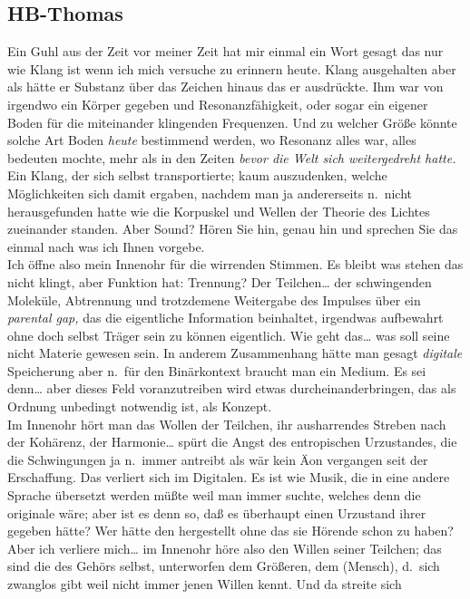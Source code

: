 \documentclass[
]{article}
\author{}
\date{\vspace{-2.5em}}
\begin{document}
\subsection{HB-Thomas}\label{hb-thomas}

Ein Guhl aus der Zeit vor meiner Zeit hat mir einmal ein Wort gesagt das
nur wie Klang ist wenn ich mich versuche zu erinnern heute. Klang
ausgehalten aber als hätte er Substanz über das Zeichen hinaus das er
ausdrückte. Ihm war von irgendwo ein Körper gegeben und
Resonanzfähigkeit, oder sogar ein eigener Boden für die miteinander
klingenden Frequenzen. Und zu welcher Größe könnte solche Art Boden
\emph{heute} bestimmend werden, wo Resonanz alles war, alles bedeuten
mochte, mehr als in den Zeiten \emph{bevor die Welt sich weitergedreht
hatte.} Ein Klang, der sich selbst transportierte; kaum auszudenken,
welche Möglichkeiten sich damit ergaben, nachdem man ja andererseits
n.~nicht herausgefunden hatte wie die Korpuskel und Wellen der Theorie
des Lichtes zueinander standen. Aber Sound? Hören Sie hin, genau hin und
sprechen Sie das einmal nach was ich Ihnen vorgebe.\\
Ich öffne also mein Innenohr für die wirrenden Stimmen. Es bleibt was
stehen das nicht klingt, aber Funktion hat: Trennung? Der
Teilchen\ldots{} der schwingenden Moleküle, Abtrennung und trotzdemene
Weitergabe des Impulses über ein \emph{parental gap, }das die
eigentliche Information beinhaltet, irgendwas aufbewahrt ohne doch
selbst Träger sein zu können eigentlich. Wie geht das\ldots{} was soll
seine nicht Materie gewesen sein. In anderem Zusammenhang hätte man
gesagt \emph{digitale} Speicherung aber n.~für den Binärkontext braucht
man ein Medium. Es sei denn\ldots{} aber dieses Feld voranzutreiben wird
etwas durcheinanderbringen, das als Ordnung unbedingt notwendig ist, als
Konzept.\\
Im Innenohr hört man das Wollen der Teilchen, ihr ausharrendes Streben
nach der Kohärenz, der Harmonie\ldots{} spürt die Angst des entropischen
Urzustandes, die die Schwingungen ja n.~immer antreibt als wär kein Äon
vergangen seit der Erschaffung. Das verliert sich im Digitalen. Es ist
wie Musik, die in eine andere Sprache übersetzt werden müßte weil man
immer suchte, welches denn die originale wäre; aber ist es denn so, daß
es überhaupt einen Urzustand ihrer gegeben hätte? Wer hätte den
hergestellt ohne das sie Hörende schon zu haben? Aber ich verliere
mich\ldots{} im Innenohr höre also den Willen seiner Teilchen; das sind
die des Gehörs selbst, unterworfen dem Größeren, dem (Mensch), d.~sich
zwanglos gibt weil nicht immer jenen Willen kennt. Und da streite sich
\end{document}
